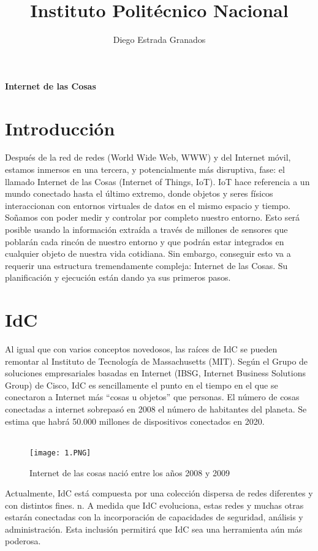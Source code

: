 \documentclass[12pt,letterpaper]{article}
\author{Diego Estrada Granados}
\title{Instituto Politécnico Nacional }
\begin{document}
\maketitle
\begin{center}
\textbf{Internet de las Cosas}
\end{center}

\section*{Introducción}
Después de la red de redes (World Wide Web, WWW) y del Internet móvil, estamos
inmersos en una tercera, y potencialmente más disruptiva, fase: el llamado Internet de las
Cosas (Internet of Things, IoT).
IoT hace referencia a un mundo conectado hasta el último extremo, donde objetos y seres
físicos interaccionan con entornos virtuales de datos en el mismo espacio y tiempo.
Soñamos con poder medir y controlar por completo nuestro entorno. Esto será posible
usando la información extraída a través de millones de sensores que poblarán cada rincón
de nuestro entorno y que podrán estar integrados en cualquier objeto de nuestra vida
cotidiana. Sin embargo, conseguir esto va a requerir una estructura tremendamente
compleja: Internet de las Cosas. Su planificación y ejecución están dando ya sus primeros
pasos.

\section*{IdC}
Al igual que con varios conceptos novedosos, las raíces de IdC se pueden remontar al
Instituto de Tecnología de Massachusetts (MIT).
Según el Grupo de soluciones empresariales basadas en Internet (IBSG, Internet
Business Solutions Group) de Cisco, IdC es sencillamente el punto en el tiempo en el que se
conectaron a Internet más “cosas u objetos” que personas. El número de cosas conectadas a internet sobrepasó en 2008 el número de
habitantes del planeta. Se estima que habrá 50.000 millones de dispositivos
conectados en 2020.
\\
\\

\begin{figure}[hbtp]
\centering
\texttt{[image: 1.PNG]}
\caption{Internet de las cosas nació entre los años 2008 y 2009}
\end{figure}

Actualmente, IdC está compuesta por una colección dispersa de redes diferentes y con
distintos fines. n. A medida que IdC evoluciona, estas redes y muchas otras estarán
conectadas con la incorporación de capacidades de seguridad, análisis y administración. Esta inclusión permitirá que IdC sea una herramienta aún más poderosa. 
\end{document}
